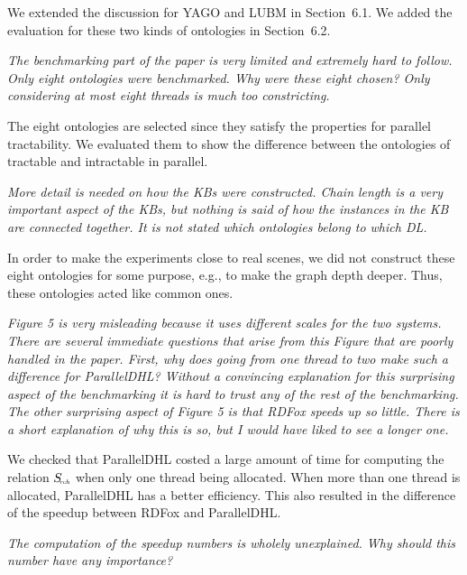 \documentclass{article}
\let\quoteOld\quote
\let\endquoteOld\endquote
\renewenvironment{quote}{\quoteOld\itshape}{\endquoteOld}
\begin{document}
We extended the discussion for YAGO and LUBM in Section~6.1. We added the evaluation
for these two kinds of ontologies in Section~6.2.

\begin{quote}
The benchmarking part of the paper is very limited and extremely hard to
follow.    Only eight ontologies were benchmarked.  Why were these eight
chosen?  Only considering at most eight threads is much too constricting.
\end{quote}

The eight ontologies are selected since they satisfy the properties for parallel tractability.
We evaluated them to show the difference between the ontologies of tractable and intractable
in parallel.


\begin{quote}
More detail is needed on how the KBs were constructed.  Chain length is a
very important aspect of the KBs, but nothing is said of how the instances
in the KB are connected together.  It is not stated which ontologies belong
to which DL.
\end{quote}

In order to make the experiments close to real scenes, we did not
construct these eight ontologies for some purpose, e.g., to
make the graph depth deeper. Thus, these ontologies acted like common ones.


\begin{quote}
Figure 5 is very misleading because it uses different scales for the two
systems.   There are several immediate questions that arise from this Figure
that are poorly handled in the paper.  First, why does going from one thread
to two make such a difference for ParallelDHL?  Without a convincing
explanation for this surprising aspect of the benchmarking it is hard to
trust any of the rest of the benchmarking.  The other surprising aspect of
Figure 5 is that RDFox speeds up so little.  There is a short explanation of
why this is so, but I would have liked to see a longer one.
\end{quote}


We checked that ParallelDHL costed a large amount of time for computing
the relation $S_{\textit{\!\tiny rch}}$ when only one thread being allocated.
When more than one thread is allocated, ParallelDHL has a better efficiency.
This also resulted in the difference of the speedup between RDFox and ParallelDHL.


\begin{quote}
The computation of the speedup numbers is wholely unexplained.  Why should
this number have any importance?
\end{quote}
\end{document}
